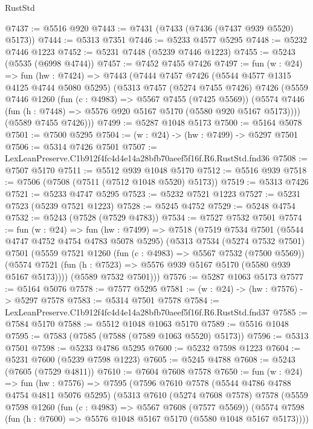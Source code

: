 \begin{lexlean}{RustStd}
\begin{coremodule}
@7437 := @5516 @920
@7443 := @7431 (@7433 (@7436 (@7437 @939 @5520) @5173))
@7444 := @5313 @7351
@7446 := @5233 @4577 @5295
@7448 := @5232 @7446 @1223
@7452 := @5231 @7448 (@5239 @7446 @1223)
@7455 := @5243 (@5535 (@6998 @4744))
@7457 := @7452 @7455 @7426
@7497 := fun (w : @24) =>
  fun (hw : @7424) =>
  @7443
    (@7444
      @7457
      @7426
      (@5544 @4577 @1315 @4125 @4744 @5080 @5295)
      (@5313
        @7457
        (@5274 @7455 @7426)
        @7426
        (@5559
          @7446
          @1260
          (fun (c : @4983) => @5567 @7455 (@7425 @5569))
          (@5574 @7446 (fun (h : @7448) => @5576 @920 @5167 @5170 (@5580 @920 @5167 @5173))))
        (@5589 @7455 @7426)))
@7499 := @5287 @1048 @5173
@7500 := @5164 @5078
@7501 := @7500 @5295
@7504 := (w : @24) -> (hw : @7499) -> @5297 @7501
@7506 := @5314 @7426 @7501
@7507 := LexLeanPreserve.C1b912f4fc4d4e14a28bfb70aeef5f16f.R6.RustStd.fnd36
@7508 := @7507 @5170
@7511 := @5512 @939 @1048 @5170
@7512 := @5516 @939
@7518 := @7506 (@7508 (@7511 (@7512 @1048 @5520) @5173))
@7519 := @5313 @7426
@7521 := @5233 @4747 @5295
@7523 := @5232 @7521 @1223
@7527 := @5231 @7523 (@5239 @7521 @1223)
@7528 := @5245 @4752
@7529 := @5248 @4754
@7532 := @5243 (@7528 (@7529 @4783))
@7534 := @7527 @7532 @7501
@7574 := fun (w : @24) =>
  fun (hw : @7499) =>
  @7518
    (@7519
      @7534
      @7501
      (@5544 @4747 @4752 @4754 @4783 @5078 @5295)
      (@5313
        @7534
        (@5274 @7532 @7501)
        @7501
        (@5559
          @7521
          @1260
          (fun (c : @4983) => @5567 @7532 (@7500 @5569))
          (@5574 @7521 (fun (h : @7523) => @5576 @939 @5167 @5170 (@5580 @939 @5167 @5173))))
        (@5589 @7532 @7501)))
@7576 := @5287 @1063 @5173
@7577 := @5164 @5076
@7578 := @7577 @5295
@7581 := (w : @24) -> (hw : @7576) -> @5297 @7578
@7583 := @5314 @7501 @7578
@7584 := LexLeanPreserve.C1b912f4fc4d4e14a28bfb70aeef5f16f.R6.RustStd.fnd37
@7585 := @7584 @5170
@7588 := @5512 @1048 @1063 @5170
@7589 := @5516 @1048
@7595 := @7583 (@7585 (@7588 (@7589 @1063 @5520) @5173))
@7596 := @5313 @7501
@7598 := @5233 @4786 @5295
@7600 := @5232 @7598 @1223
@7604 := @5231 @7600 (@5239 @7598 @1223)
@7605 := @5245 @4788
@7608 := @5243 (@7605 (@7529 @4811))
@7610 := @7604 @7608 @7578
@7650 := fun (w : @24) =>
  fun (hw : @7576) =>
  @7595
    (@7596
      @7610
      @7578
      (@5544 @4786 @4788 @4754 @4811 @5076 @5295)
      (@5313
        @7610
        (@5274 @7608 @7578)
        @7578
        (@5559
          @7598
          @1260
          (fun (c : @4983) => @5567 @7608 (@7577 @5569))
          (@5574 @7598 (fun (h : @7600) => @5576 @1048 @5167 @5170 (@5580 @1048 @5167 @5173))))

\end{coremodule}
\end{lexlean}
